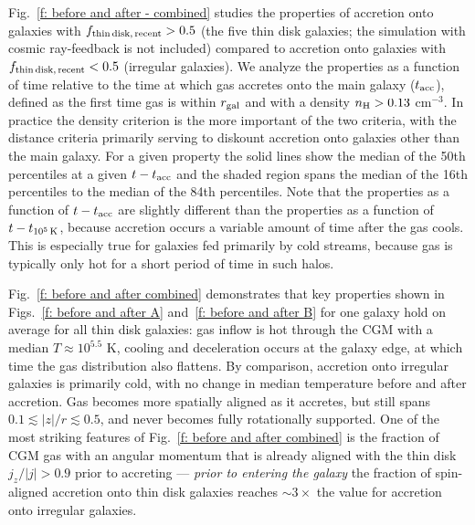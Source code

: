 \documentclass[fleqn,usenatbib]{mnras}
\newcommand{\fthin}{f_{\rm thin\,disk,\,recent}}
\newcommand{\tcools}{t_{10^5\,{\rm K}}}
\newcommand{\tacc}{t_{\rm acc}}
\begin{document}
Fig.~\ref{f: before and after - combined} studies the properties of accretion onto galaxies with $\fthin > 0.5$ (the five thin disk galaxies; the simulation with cosmic ray-feedback is not included) compared to accretion onto galaxies with $\fthin < 0.5$ (irregular galaxies).
We analyze the properties as a function of time relative to the time at which gas accretes onto the main galaxy ($\tacc$), defined as the first time gas is within $r_{\rm gal}$ and with a density  $n_{\rm H} > 0.13$ cm$^{-3}$.
In practice the density criterion is the more important of the two criteria, with the distance criteria primarily serving to diskount accretion onto galaxies other than the main galaxy.
For a given property the solid lines show the median of the 50th percentiles at a given $t - \tacc$ and the shaded region spans the median of the 16th percentiles to the median of the 84th percentiles.
Note that the properties as a function of $t - \tacc$ are slightly different than the properties as a function of $t - \tcools$, because accretion occurs a variable amount of time after the gas cools.
This is especially true for galaxies fed primarily by cold streams, because gas is typically only hot for a short period of time in such halos.

Fig.~\ref{f: before and after combined} demonstrates that key properties shown in Figs.~\ref{f: before and after A} and~\ref{f: before and after B} for one galaxy hold on average for all thin disk galaxies:
gas inflow is hot through the CGM with a median $T \approx 10^{5.5}$ K,
cooling and deceleration occurs at the galaxy edge,
at which time the gas distribution also flattens.
By comparison, accretion onto irregular galaxies is primarily cold, with no change in median temperature before and after accretion.
Gas becomes more spatially aligned as it accretes, but still spans $0.1 \lesssim \vert z \vert / r \lesssim 0.5$, and never becomes fully rotationally supported.
One of the most striking features of Fig.~\ref{f: before and after combined} is the fraction of CGM gas with an angular momentum that is already aligned with the thin disk $j_z/\vert j \vert > 0.9$ prior to accreting --- \textit{prior to entering the galaxy} the fraction of spin-aligned accretion onto thin disk galaxies reaches $\sim 3 \times$ the value for accretion onto irregular galaxies.
\end{document}
